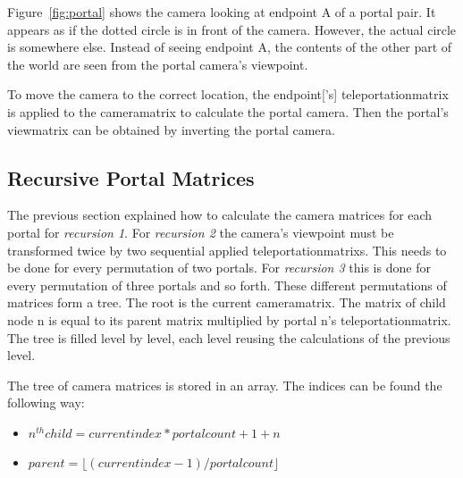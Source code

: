 Figure~\ref{fig:portal} shows the camera looking at endpoint A of a portal pair. It appears as if the dotted circle is in front of the camera. However, the actual circle is somewhere else. Instead of seeing endpoint A, the contents of the other part of the world are seen from the portal camera's viewpoint.


To move the camera to the correct location, the \gls{endpoint}['s] \gls{teleportationmatrix} is applied to the \gls{cameramatrix} to calculate the portal camera. Then the portal's \gls{viewmatrix} can be obtained by inverting the portal camera.






\subsection{Recursive Portal Matrices}
\label{section:recursivecameramatrices}
The previous section explained how to calculate the camera matrices for each portal for \textit{recursion 1}. For \textit{recursion 2} the camera's viewpoint must be transformed twice by two sequential applied \glspl{teleportationmatrix}. This needs to be done for every permutation of two portals. For \textit{recursion 3} this is done for every permutation of three portals and so forth. These different permutations of matrices form a tree. The root is the current \gls{cameramatrix}. The matrix of child node n is equal to its parent matrix multiplied by portal n's \gls{teleportationmatrix}. The tree is filled level by level, each level reusing the calculations of the previous level.




The tree of camera matrices is stored in an array. The indices can be found the following way:

\begin{itemize}
	\item $ n^{th} child = current index * portalcount + 1 + n$
	\item $ parent = \lfloor(current index-1)/portal count\rfloor $
\end{itemize}



